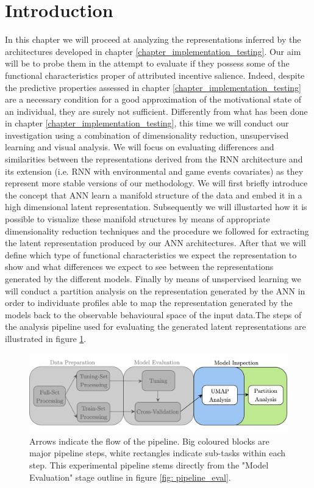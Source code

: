 \section{Introduction}
\label{representation_analysis_introduction}
In this chapter we will proceed at analyzing the representations inferred by the architectures developed in chapter \ref{chapter_implementation_testing}. Our aim will be to probe them in the attempt to evaluate if they possess some of the functional characteristics proper of attributed incentive salience. Indeed, despite the predictive properties assessed in chapter \ref{chapter_implementation_testing} are a necessary condition for a good approximation of the motivational state  of an individual, they are surely not sufficient. Differently from what has been done in chapter \ref{chapter_implementation_testing}, this time we will conduct our investigation using  a combination of dimensionality reduction, unsupervised learning and visual analysis.  We will focus on evaluating differences and similarities between the representations derived from the RNN architecture and its extension (i.e. RNN with environmental and game events covariates) as they represent more stable versions of our methodology. We will first briefly introduce the concept that ANN learn a manifold structure of the data and embed it in a high dimensional latent representation. Subsequently we will illustarted how it is possible to visualize these manifold structures by means of appropriate dimensionality reduction techniques and the procedure we followed for extracting the latent representation produced by our ANN architectures. After that we will define which type of functional characteristics we expect the representation to show and what differences we expect to see between the representations generated by the different models. Finally by means of unspervised learning we will conduct a partition analysis on the representation generated by the ANN in order to individuate profiles able to map the representation generated by the models back to the observable behavioural space of the input data.The steps of the analysis pipeline used for evaluating the generated latent representations are illustrated in figure \ref{fig: pipeline_inspect}.
\begin{figure}[h]
  \centering
  \includegraphics[width=\textwidth]{images/chapter_4/pipeline_inspect.png}
    \caption[\textbf{Representation analysis experimental pipeline}]{Arrows indicate the flow of the pipeline. Big coloured blocks are major pipeline steps, white rectangles indicate sub-tasks within each step. This experimental pipeline stems directly from the "Model Evaluation" stage outline in figure \ref{fig: pipeline_eval}.}
    \label{fig: pipeline_inspect}
\end{figure}

